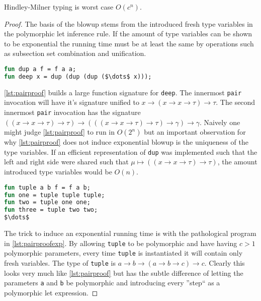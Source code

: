 \documentclass[11pt,oneside,a4paper]{report}
\begin{document}
\begin{lemma}
    Hindley-Milner typing is worst case $O(c^n)$.
\end{lemma}
\begin{proof}
    The basis of the blowup stems from the introduced fresh type variables in the polymorphic let inference rule.
    If the amount of type variables can be shown to be exponential the running time must be at least the same by operations such as subsection set combination and unification.
\begin{lstlisting}[language=ML,caption={Nested pair},label={lst:pairproof},mathescape=true]
fun dup a f = f a a;
fun deep x = dup (dup (dup ($\dots$ x)));
\end{lstlisting}
    \autoref{lst:pairproof} builds a large function signature for \texttt{deep}.
    The innermost \texttt{pair} invocation will have it's signature unified to $x \rightarrow (x \rightarrow x \rightarrow \tau) \rightarrow \tau$.
    The second innermost \texttt{pair} invocation has the signature $((x \rightarrow x \rightarrow \tau) \rightarrow \tau) \rightarrow (((x \rightarrow x \rightarrow \tau) \rightarrow \tau) \rightarrow \gamma) \rightarrow \gamma$.
    Naively one might judge \autoref{lst:pairproof} to run in $O(2^n)$ but an important observation for why \autoref{lst:pairproof} does not induce exponential blowup is the uniqueness of the type variables.
    If an efficient representation of \texttt{dup} was implemented such that the left and right side were shared such that $\mu \mapsto ((x \rightarrow x \rightarrow \tau) \rightarrow \tau)$, the amount introduced type variables would be $O(n)$.
\begin{lstlisting}[language=ML,caption={Nested pairs with different type variables},label={lst:pairproofexp},mathescape=true]
fun tuple a b f = f a b;
fun one = tuple tuple tuple;
fun two = tuple one one;
fun three = tuple two two;
$\dots$
\end{lstlisting}
    The trick to induce an exponential running time is with the pathological program in \autoref{lst:pairproofexp}.
    By allowing \texttt{tuple} to be polymorphic and have having $c > 1$ polymorphic parameters, every time \texttt{tuple} is instantiated it will contain only fresh variables.
    The type of \texttt{tuple} is $a \rightarrow b \rightarrow (a \rightarrow b \rightarrow c) \rightarrow c$.
    Clearly this looks very much like \autoref{lst:pairproof} but has the subtle difference of letting the parameters \texttt{a} and \texttt{b} be polymorphic and introducing every ''step`` as a polymorphic let expression.

\end{proof}
\end{document}
